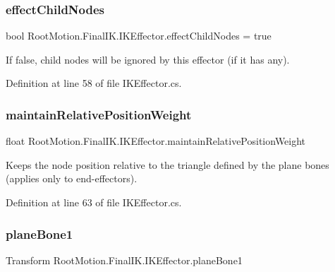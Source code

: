 \subsubsection{\texorpdfstring{effect\+Child\+Nodes}{effectChildNodes}}
{\footnotesize\ttfamily bool Root\+Motion.\+Final\+I\+K.\+I\+K\+Effector.\+effect\+Child\+Nodes = true}



If false, child nodes will be ignored by this effector (if it has any). 



Definition at line 58 of file I\+K\+Effector.\+cs.

\mbox{\label{class_root_motion_1_1_final_i_k_1_1_i_k_effector_af4de90c9a0646ec31ca83c4a00e9a160}} 
\subsubsection{\texorpdfstring{maintain\+Relative\+Position\+Weight}{maintainRelativePositionWeight}}
{\footnotesize\ttfamily float Root\+Motion.\+Final\+I\+K.\+I\+K\+Effector.\+maintain\+Relative\+Position\+Weight}



Keeps the node position relative to the triangle defined by the plane bones (applies only to end-\/effectors). 



Definition at line 63 of file I\+K\+Effector.\+cs.

\mbox{\label{class_root_motion_1_1_final_i_k_1_1_i_k_effector_a5b53ab6d498f54959468909b5865db7c}} 
\subsubsection{\texorpdfstring{plane\+Bone1}{planeBone1}}
{\footnotesize\ttfamily Transform Root\+Motion.\+Final\+I\+K.\+I\+K\+Effector.\+plane\+Bone1}



